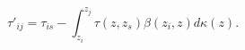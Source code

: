 \begin{equation}
\tau'_{i j} = \tau_{i s} - \int_{z_i}^{z_j}\tau(z, z_s)\beta(z_i,z)d\kappa(z).
\end{equation}